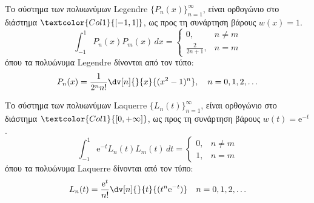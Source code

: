 \begin{prop}
  Το σύστημα των πολυωνύμων \textcolor{Col1}{Legendre} $ \{P_{n}(x)\}_{n=1}^{\infty} $, 
  είναι ορθογώνιο στο διάστημα $ \textcolor{Col1}{[-1,1]} $, ως προς τη συνάρτηση 
  βάρους $ w(x)=1 $.
  \[
    \int _{-1}^{1} P_{n}(x)P_{m}(x) \,{dx} = 
    \begin{cases}  
      0, & n \neq m \\
      \frac{2}{2n+1}, & n=m
    \end{cases}
  \] 
  όπου τα πολυώνυμα Legendre δίνονται από τον τύπο:
  \[
    P_{n}(x) = \frac{1}{2^{n} n!} \dv[n]{}{x} {(x^{2}-1)^{n}}, 
    \quad n=0,1,2,\ldots
  \]
\end{prop}

\begin{prop}
  Το σύστημα των πολυωνύμων \textcolor{Col1}{Laquerre} $ \{L_{n}(t)\}_{n=1}^{\infty} $, 
  είναι ορθογώνιο στο διάστημα $ \textcolor{Col1}{[0,+\infty]} $, ως προς τη συνάρτηση 
  βάρους $ w(t)= \mathrm{e}^{-t} $.
  \[
    \int _{-1}^{1} \mathrm{e}^{-t}  L_{n}(t)L_{m}(t) \,{dt} = 
    \begin{cases}  
      0, & n \neq m \\
      1, & n=m
    \end{cases}
  \] 
  όπου τα πολυώνυμα Laquerre δίνονται από τον τύπο:
  \[
    L_{n}(t) = \frac{\mathrm{e}^{t}}{n!} \dv[n]{}{t}{(t^{n} \mathrm{e}^{-t})}  
    \quad n=0,1,2,\ldots
  \] 
\end{prop}

